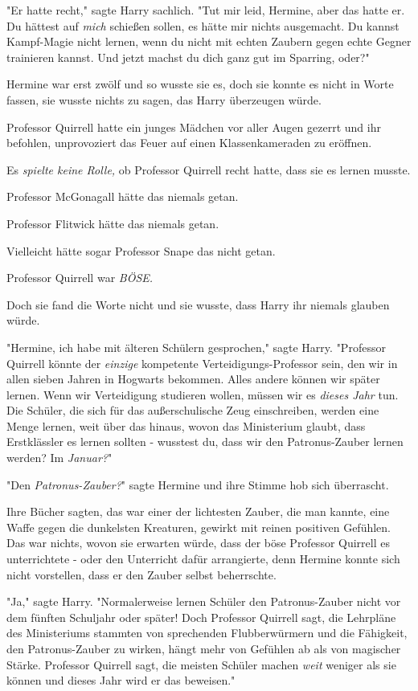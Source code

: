 {"Er hatte recht," sagte Harry sachlich. "Tut mir leid, Hermine, aber das hatte er. Du hättest auf \emph{mich} schießen sollen, es hätte mir nichts ausgemacht. Du kannst Kampf-Magie nicht lernen, wenn du nicht mit echten Zaubern gegen echte Gegner trainieren kannst. Und jetzt machst du dich ganz gut im Sparring, oder?"

Hermine war erst zwölf und so wusste sie es, doch sie konnte es nicht in Worte fassen, sie wusste nichts zu sagen, das Harry überzeugen würde.

Professor Quirrell hatte ein junges Mädchen vor aller Augen gezerrt und ihr befohlen, unprovoziert das Feuer auf einen Klassenkameraden zu eröffnen.

Es \emph{spielte keine Rolle,} ob Professor Quirrell recht hatte, dass sie es lernen musste.

Professor McGonagall hätte das niemals getan.

Professor Flitwick hätte das niemals getan.

Vielleicht hätte sogar Professor Snape das nicht getan.

Professor Quirrell war \emph{BÖSE.}

Doch sie fand die Worte nicht und sie wusste, dass Harry ihr niemals glauben würde.

"Hermine, ich habe mit älteren Schülern gesprochen," sagte Harry. "Professor Quirrell könnte der \emph{einzige} kompetente Verteidigungs-Professor sein, den wir in allen sieben Jahren in Hogwarts bekommen. Alles andere können wir später lernen. Wenn wir Verteidigung studieren wollen, müssen wir es \emph{dieses Jahr} tun. Die Schüler, die sich für das außerschulische Zeug einschreiben, werden eine Menge lernen, weit über das hinaus, wovon das Ministerium glaubt, dass Erstklässler es lernen sollten - wusstest du, dass wir den Patronus-Zauber lernen werden? Im \emph{Januar?}"

"Den \emph{Patronus-Zauber?}" sagte Hermine und ihre Stimme hob sich überrascht.

Ihre Bücher sagten, das war einer der lichtesten Zauber, die man kannte, eine Waffe gegen die dunkelsten Kreaturen, gewirkt mit reinen positiven Gefühlen. Das war nichts, wovon sie erwarten würde, dass der böse Professor Quirrell es unterrichtete - oder den Unterricht dafür arrangierte, denn Hermine konnte sich nicht vorstellen, dass er den Zauber selbst beherrschte.

"Ja," sagte Harry. "Normalerweise lernen Schüler den Patronus-Zauber nicht vor dem fünften Schuljahr oder später! Doch Professor Quirrell sagt, die Lehrpläne des Ministeriums stammten von sprechenden Flubberwürmern und die Fähigkeit, den Patronus-Zauber zu wirken, hängt mehr von Gefühlen ab als von magischer Stärke. Professor Quirrell sagt, die meisten Schüler machen \emph{weit} weniger als sie können und dieses Jahr wird er das beweisen."

}
